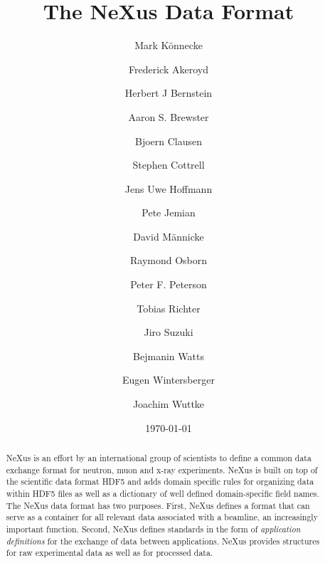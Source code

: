 \documentclass[%
 aip,
rsi,
 amsmath,amssymb,
 reprint,%
]{revtex4-1}
\begin{document}

\title{The NeXus Data Format}


\author{Mark K\"onnecke}

\author{Frederick Akeroyd}

\author{Herbert J Bernstein}

\author{Aaron S. Brewster}

\author{Bjoern Clausen}

\author{Stephen Cottrell}

\author{Jens Uwe Hoffmann}

\author{Pete Jemian}

\author{David M\"annicke}

\author{Raymond Osborn}

\author{Peter F. Peterson}

\author{Tobias Richter}

\author{Jiro Suzuki}

\author{Bejmanin Watts}

\author{Eugen Wintersberger}

\author{Joachim Wuttke}



\date{\today}%

\begin{abstract}
NeXus is an effort by an international group of scientists to define 
 a common data exchange format for neutron, muon and x-ray experiments.   
NeXus is built on top of the scientific data format HDF5 and adds domain 
specific rules for organizing data within HDF5 files as well as a dictionary of well 
defined domain-specific field names. The NeXus data format has two purposes.  First, NeXus defines a
format that can serve as a container for all relevant data associated
with a beamline, an increasingly important function.  Second, NeXus
defines standards in the form of \emph{application definitions} for the
exchange of data between applications.  NeXus provides structures for raw experimental data as well as for processed data.  
\end{abstract}
\end{document}
